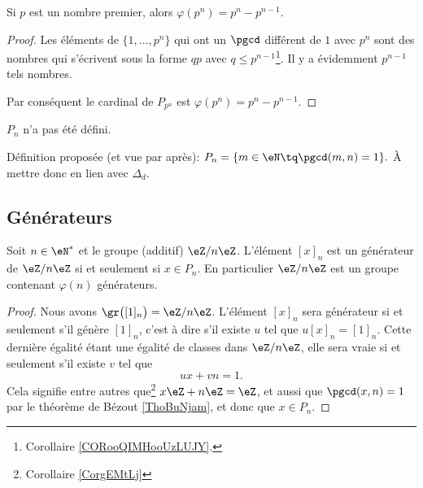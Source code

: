 \begin{lemma}
    Si \( p\) est un nombre premier, alors \( \varphi(p^n)=p^n-p^{n-1}\).
\end{lemma}

\begin{proof}
    Les éléments de \( \{ 1,\ldots,p^n \}\) qui ont un \( \pgcd\) différent de \( 1\) avec \( p^n\) sont des nombres qui s'écrivent sous la forme \( qp\) avec \( q\leq p^{n-1}\)\footnote{Corollaire \ref{CORooQIMHooUzLUJY}.}. Il y a évidemment \( p^{n-1}\) tels nombres.

    Par conséquent le cardinal de \( P_{p^n}\) est \( \varphi(p^{n})=p^n-p^{n-1}\).
\end{proof}

\begin{probleme}
    $P_n$ n'a pas été défini.

    Définition proposée (et vue par après): \( P_n = \{ m \in \eN \tq \pgcd(m,n) = 1 \}. \) À mettre donc en lien avec $\Delta_d$.
\end{probleme}

\subsection{Générateurs}

\begin{proposition}     \label{PropZnmuphiGensn}
    Soit \( n\in\eN^*\) et le groupe (additif) \( \eZ/n\eZ\). L'élément \( [x]_n\) est un générateur de \( \eZ/n\eZ\) si et seulement si \( x\in P_n\). En particulier \( \eZ/n\eZ\) est un groupe contenant \( \varphi(n)\) générateurs.
\end{proposition}

\begin{proof}
    Nous avons \( \gr\big( [1]_n \big)=\eZ/n\eZ\). L'élément \( [x]_n\) sera générateur si et seulement s'il génère \( [1]_n \), c'est à dire s'il existe \( u\) tel que \( u[x]_n=[1]_n\). Cette dernière égalité étant une égalité de classes dans \( \eZ/n\eZ\), elle sera vraie si et seulement s'il existe \( v\) tel que
    \begin{equation}
        ux+vn=1.
    \end{equation}
    Cela signifie entre autres que\footnote{Corollaire \ref{CorgEMtLj}} \( x\eZ+n\eZ=\eZ\), et aussi que \( \pgcd(x,n)=1\) par le théorème de Bézout \ref{ThoBuNjam}, et donc que \( x\in P_n\).
\end{proof}

